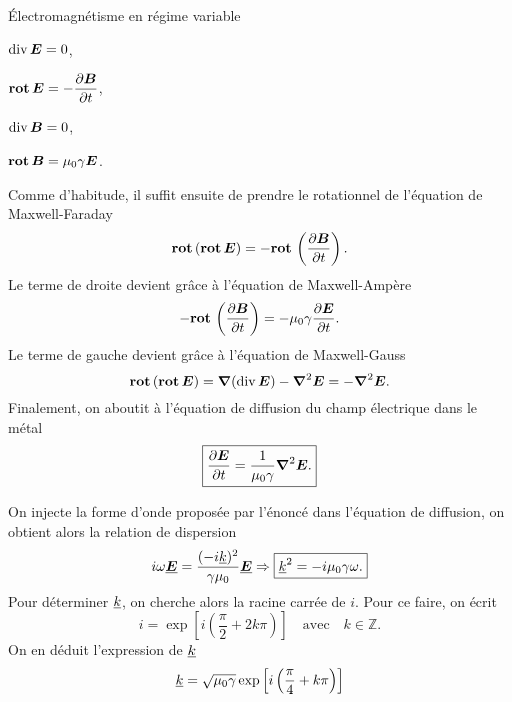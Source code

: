 \begin{corr}{Électromagnétisme en régime variable}
\begin{corrlist}
		\begin{description}[labelindent=2em, itemsep=1em]
			\item[Maxwell-Gauss : ] $\div \vece = 0$,
			\item[Maxwell-Faraday : ] $\rot \vece = -\dd{\vecb}{t}$,
			\item[Maxwell-Thomson : ] $\div \vecb = 0$,
			\item[Maxwell-Ampère : ] $\rot \vecb = \mu_0 \gamma \vece$.
		\end{description}
		Comme d'habitude, il suffit ensuite de prendre le rotationnel
		de l'équation de Maxwell-Faraday
		\begin{equation*}
			\rot(\rot \vece) = -\rot\left(\dd{\vecb}{t}\right).
		\end{equation*}
		Le terme de droite devient grâce à l'équation de Maxwell-Ampère
		\begin{equation*}
			-\rot\left(\dd{\vecb}{t}\right) = -\mu_0 \gamma \dd{\vece}{t}.
		\end{equation*}
		Le terme de gauche devient grâce à l'équation de Maxwell-Gauss
		\begin{equation*}
			\rot(\rot \vece) = \grad(\div \vece) - \laplacien \vece
			= -\laplacien \vece.
		\end{equation*}
		Finalement, on aboutit à l'équation de diffusion du champ électrique
		dans le métal
		\begin{equation*}
			\boxed{
			\dd{\vece}{t} = \dfrac{1}{\mu_0 \gamma}\laplacien \vece.
		}
		\end{equation*}
	\item On injecte la forme d'onde proposée par l'énoncé dans l'équation
	      de diffusion, on obtient alors la relation de dispersion
	      \begin{equation*}
		      i \omega \complex{\vece} = \dfrac{(-i\complex{k})^2}{\gamma \mu_0}
		      \complex{\vece} \Rightarrow \boxed{\complex{k}^2 = -i \mu_0 \gamma 
		      \omega.}
	      \end{equation*}
	      Pour déterminer $\underline{k}$, on cherche alors la racine carrée de 
	      $i$. Pour ce faire, on écrit
	      \begin{equation*}
		      i = \exp\left[i\left(\dfrac{\pi}{2} + 2 k \pi \right)\right]
		      \quad \mathrm{avec} \quad k \in \mathbb{Z}.
	      \end{equation*}
	      On en déduit l'expression de $\underline{k}$
	      \begin{equation*}
		      \complex{k} = \sqrt{\mu_0 \gamma}\exp
		      \left[i\left(\dfrac{\pi}{4} +  k \pi \right)\right]

\end{equation*}
\end{corrlist}
\end{corr}
